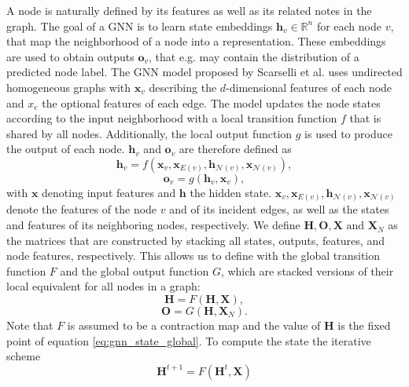 A node is naturally defined by its features as well as its related notes in the graph. The goal of a GNN is to learn state embeddings $\mathbf{h}_v \in \mathbb{R}^n$ for each node $v$, that map the neighborhood of a node into a representation. These embeddings are used to obtain outputs $\mathbf{o}_v$, that e.g. may contain the distribution of a predicted node label. The GNN model proposed by Scarselli et al. \cite{4700287} uses undirected homogeneous graphs with $\mathbf{x}_v$ describing the $d$-dimensional features of each node and $x_e$ the optional features of each edge. The model updates the node states according to the input neighborhood with a local transition function $f$ that is shared by all nodes. Additionally, the local output function $g$ is used to produce the output of each node. $\mathbf{h}_v$ and $\mathbf{o}_v$ are therefore defined as
\begin{equation}
    \mathbf{h}_v = f(\mathbf{x}_v, \mathbf{x}_{E(v)}, \mathbf{h}_{\mathcal{N}(v)}, \mathbf{x}_{\mathcal{N}(v)}),
    \label{eq:gnn_state_local}
\end{equation}
\begin{equation}
    \mathbf{o}_v = g(\mathbf{h}_v, \mathbf{x}_v),
\end{equation}
with $\mathbf{x}$ denoting input features and $\mathbf{h}$ the hidden state. $\mathbf{x}_v, \mathbf{x}_{E(v)}, \mathbf{h}_{\mathcal{N}(v)}, \mathbf{x}_{\mathcal{N}(v)}$ denote the features of the node $v$ and of its incident edges, as well as the states and features of its neighboring nodes, respectively. We define $\mathbf{H}, \mathbf{O}, \mathbf{X} \text{ and  }\mathbf{X}_N$ as the matrices that are constructed by stacking all states, outputs, features, and node features, respectively. This allows us to define with the global transition function $F$ and the global output function $G$, which are stacked versions of their local equivalent for all nodes in a graph: 
\begin{equation}
    \mathbf{H} = F(\mathbf{H}, \mathbf{X}),
    \label{eq:gnn_state_global}
\end{equation}
\begin{equation}
    \mathbf{O} = G(\mathbf{H},\mathbf{X}_N).
\end{equation}
Note that $F$ is assumed to be a contraction map and the value of $\mathbf{H}$ is the fixed point of equation \eqref{eq:gnn_state_global}. To compute the state the iterative scheme
\begin{equation}
    \label{eq:GNN_iterations}
    \mathbf{H}^{t+1} = F(\mathbf{H}^{t}, \mathbf{X})
\end{equation}
